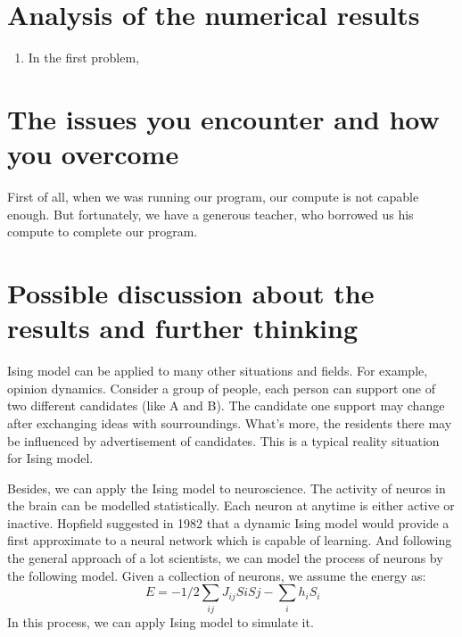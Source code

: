 \documentclass[11pt,openany]{book}              %
\begin{document}
\section{Analysis of the numerical results }
\begin{enumerate}
  \item In the first problem,
    
\end{enumerate}
\section{The issues you encounter and how you overcome }
First of all, when we was running our program, our compute is not capable enough. But fortunately, 
we have a generous teacher, who borrowed us his compute to complete our program.

\section{ Possible discussion about the results and further thinking }
Ising model can be applied to many other situations and fields. For example, opinion dynamics.
Consider a group of people, each person can support one of two different candidates (like A and B).
The candidate one support may change after exchanging ideas with sourroundings. 
What's more, the residents there may be influenced by advertisement of candidates. This is a typical
reality situation for Ising model.

Besides, we can apply the Ising model to neuroscience. The activity of neuros in the brain can be 
modelled statistically. Each neuron at anytime is either active or inactive. Hopfield suggested in 1982
that a dynamic Ising model would provide a first approximate to a neural network which is capable of learning.
And following the general approach of a lot scientists, we can model the process of neurons by the following 
model. Given a collection of neurons, we assume the energy as:
\begin{equation}
\, E = -1/2 \sum_{ij}J_{ij}SiSj-\sum_i h_iS_i
\end{equation}
In this process, we can apply Ising model to simulate it. 


%
%
\end{document}
